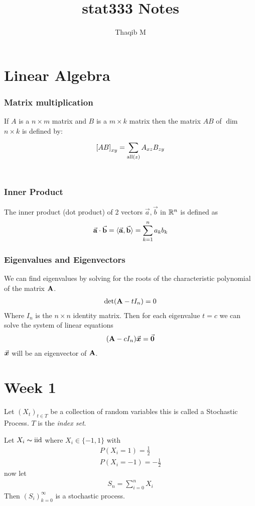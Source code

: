 \documentclass[12pt,a4paper]{article}
\author{Thaqib M}
\title{stat333 Notes}
\begin{document}
\maketitle
\newpage
\section*{Linear Algebra}
\subsubsection*{Matrix multiplication} If $A$ is a $n\times m$ matrix and $B$ is a $m\times k$ matrix then the matrix $AB$ of $\dim$ $n\times k$ is defined by: 
\begin{align*}
{\bf[}AB{\bf]}_{xy} = \sum\limits_{\mathrm{all}(z)}^{}A_{xz}B_{zy}
\end{align*}
\\
\subsubsection*{Inner Product} The inner product (dot product) of 2 vectors $\vec{a}, \vec{b}$ in $\mathbb{R}^n$ is defined as
\begin{align*}
\va{a}\cdot \va{b} = \langle\va{a},\va{b}\rangle = \sum\limits_{k=1}^{n}a_kb_k
\end{align*}
\subsubsection*{Eigenvalues and Eigenvectors}
We can find eigenvalues by solving for the roots of the characteristic polynomial of the matrix $\vb A$.
\begin{align*}
\det(\vb A-tI_n) = 0
\end{align*}
Where $I_n$ is the $n\times n$ identity matrix.
Then for each eigenvalue $t=c$ we can solve the system of linear equations 
\begin{align*}
(\vb A - cI_n)\va* x = \va* 0
\end{align*}
$\va* x$ will be an eigenvector of $\vb A$. 

\newpage
\section{Week 1}
\begin{defn}
Let $(X_t)_{t\in T}$ be a collection of random variables this is called a Stochastic Process. $T$ is the \textit{index set}. 
\end{defn}
\begin{example}
Let $X_i\thicksim \mathrm{iid}$ where $X_i \in \{-1,1\}$ with 
\begin{align*}
P(X_i = 1) = \frac{1}{2}\\
P(X_i = -1) = -\frac{1}{2}
\end{align*}
now let 
\begin{align*}
S_n = \sum_{i=0}^n X_i
\end{align*}
Then $(S_i)_{k=0}^\infty$ is a stochastic process.  
\end{example}
\end{document}
